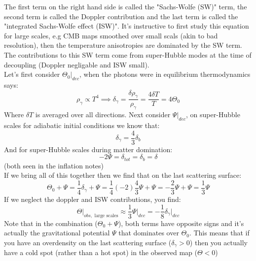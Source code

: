 \documentclass{article}
\begin{document}
The first term on the right hand side is called the "Sachs-Wolfe (SW)" term, the second term is called the Doppler contribution and the last term is called the "integrated Sachs-Wolfe effect (ISW)".
It's instructive to first study this equation for large scales, e.g CMB maps smoothed over small scals (akin to bad resolution), then the temperature anisotropies are dominated by the SW term. The contributions to this SW term come from super-Hubble modes at the time of decoupling (Doppler negligable and ISW small).\\
Let's first consider $\Theta_0\big|_{dec}$, when the photons were in equilibrium thermodynamics says:
\begin{equation}
  \rho_\gamma \propto T^4 \implies \delta_\gamma = \frac{\delta\rho_\gamma}{\rho_\gamma} = \frac{4\delta T}{T} = 4\Theta_0
\end{equation}
Where $\delta T$ is averaged over all directions. Next consider $\Psi\big|_{dec}$, on super-Hubble scales for adiabatic initial conditions we know that:
\begin{equation}
  \delta_\gamma = \frac{4}{3}\delta_b
\end{equation}
And for super-Hubble scales during matter domination:
\begin{equation}
  -2\Psi = \delta_{tot} = \delta_b = \delta
\end{equation}
(both seen in the inflation notes) \\
If we bring all of this together then we find that on the last scattering surface:
\begin{equation}
  \Theta_0 + \Psi = \frac{1}{4}\delta_\gamma + \Psi = \frac{1}{4}(-2)\frac{4}{3}\Psi + \Psi = -\frac{2}{3}\Psi + \Psi = \frac{1}{3}\Psi
\end{equation}
If we neglect the doppler and ISW contributions, you find:
\begin{equation}
  \Theta\big|_{obs,\text{ large scales}} \approx \frac{1}{3}\Psi\big|_{dec} = -\frac{1}{8}\delta_\gamma\big|_{dec}
\end{equation}
Note that in the combination ($\Theta_0 + \Psi$), both terms have opposite signs and it's actually the gravitational potential $\Psi$ that dominates over $\Theta_0$. This means that if you have an overdensity on the last scattering surface ($\delta_\gamma>0$) then you actually have a cold spot (rather than a hot spot) in the observed map ($\Theta < 0$)
\end{document}
